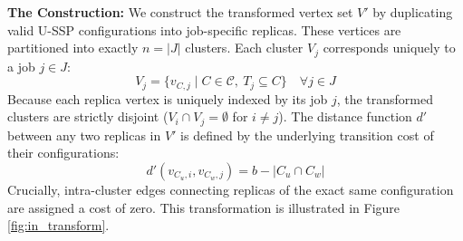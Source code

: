 \documentclass[12pt]{article}
\begin{document}
\textbf{The Construction:} We construct the transformed vertex set $V'$ by duplicating valid U-SSP configurations into job-specific replicas. These vertices are partitioned into exactly $n = |J|$ clusters. Each cluster $V_j$ corresponds uniquely to a job $j \in J$:
\begin{equation}
	V_j = \{ v_{C, j} \mid C \in \mathcal{C}, \ T_j \subseteq C \} \quad \forall j \in J
\end{equation}
Because each replica vertex is uniquely indexed by its job $j$, the transformed clusters are strictly disjoint ($V_i \cap V_j = \emptyset$ for $i \neq j$). The distance function $d'$ between any two replicas in $V'$ is defined by the underlying transition cost of their configurations:
\begin{equation}
	d'(v_{C_u, i}, v_{C_w, j}) = b - |C_u \cap C_w|
\end{equation}
Crucially, intra-cluster edges connecting replicas of the exact same configuration are assigned a cost of zero. This transformation is illustrated in Figure \ref{fig:in_transform}.
\end{document}
